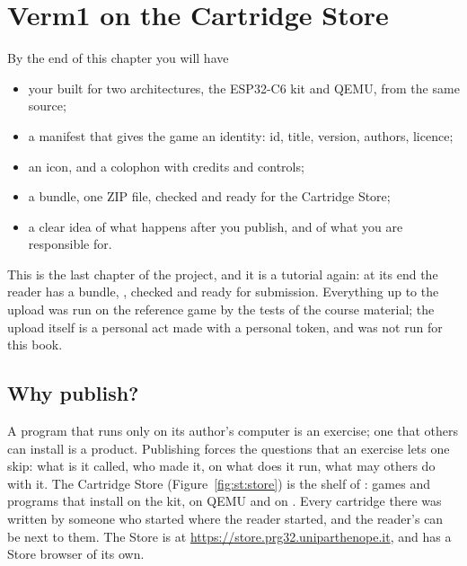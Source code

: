 \chapter{Verm1 on the Cartridge Store}
\label{ch:store}


\begin{chapgoals}
By the end of this chapter you will have
\begin{itemize}
\item your \vermone built for two architectures, the ESP32-C6 kit and QEMU, from the same source;
\item a manifest that gives the game an identity: id, title, version, authors, licence;
\item an icon, and a colophon with credits and controls;
\item a bundle, one ZIP file, checked and ready for the Cartridge Store;
\item a clear idea of what happens after you publish, and of what you are responsible for.
\end{itemize}
\end{chapgoals}


This is the last chapter of the project, and it is a tutorial again: at its
end the reader has a bundle, , checked and ready for
submission. Everything up to the upload was run on the reference game by the
tests of the course material; the upload itself is a personal act made with a
personal token, and was not run for this book.

\section{Why publish?}

A program that runs only on its author's computer is an exercise; one that
others can install is a product. Publishing forces the questions that an
exercise lets one skip: what is it called, who made it, on what does it run,
what may others do with it. The Cartridge Store
(Figure~\ref{fig:st:store}) is the shelf of \prg: games and programs that
install on the kit, on QEMU and on \prgqt. Every cartridge there was written
by someone who started where the reader started, and the reader's can be next
to them. The Store is at \url{https://store.prg32.uniparthenope.it}, and
\prgqt has a Store browser of its own.

